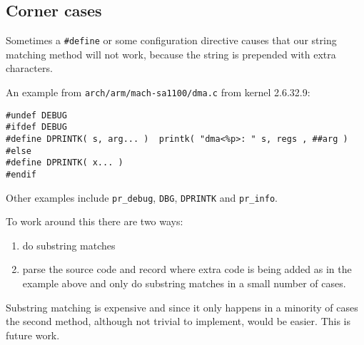 \documentclass[10pt]{article}
\begin{document}
\subsection{Corner cases}

Sometimes a \texttt{\#define} or some configuration directive causes that our 
string matching method will not work, because the string is prepended with
extra characters.

An example from \texttt{arch/arm/mach-sa1100/dma.c} from kernel 2.6.32.9:

\begin{verbatim}
#undef DEBUG
#ifdef DEBUG
#define DPRINTK( s, arg... )  printk( "dma<%p>: " s, regs , ##arg )
#else
#define DPRINTK( x... )
#endif
\end{verbatim}

Other examples include \texttt{pr\_debug}, \texttt{DBG}, \texttt{DPRINTK} and
\texttt{pr\_info}.

To work around this there are two ways:

\begin{enumerate}
\item do substring matches
\item parse the source code and record where extra code is being added as in
the example above and only do substring matches in a small number of cases.
\end{enumerate}

Substring matching is expensive and since it only happens in a minority of
cases the second method, although not trivial to implement, would be easier.
This is future work.
\end{document}

